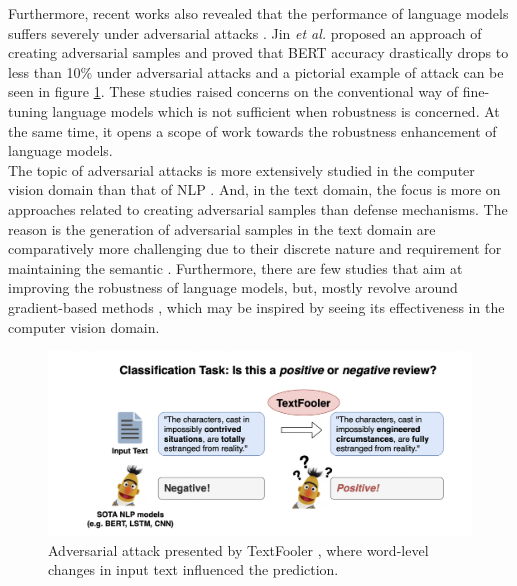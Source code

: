 \documentclass[%
	BCOR=8mm, %
	DIV=12,
	toc=bibliography, %
	toc=listof, %
	oneside, %
	egregdoesnotlikesansseriftitles, %
	]{scrbook}
\begin{document}
Furthermore,  recent works also revealed that the performance of language models suffers severely under adversarial attacks \cite{li_bert-attack_2020,garg_bae_2020,moradi_evaluating_2021-1}. Jin \textit{et al.} \cite{jin_is_2020}  proposed an approach of creating adversarial samples and proved that BERT accuracy drastically drops to less than 10\% under adversarial attacks and a pictorial example of attack can be seen in figure \ref{diag:ExampleAdversarial}. These studies raised concerns on the conventional way of fine-tuning language models which is not sufficient when robustness is concerned. At the same time, it opens a scope of work towards the robustness enhancement of language models.\\
The topic of adversarial attacks is more extensively studied in the computer vision domain than that of NLP \cite{wang_towards_2021}. And, in the text domain, the focus is more on approaches related to creating adversarial samples than defense mechanisms. The reason is the generation of adversarial samples in the text domain are comparatively more challenging due to their discrete nature and requirement for maintaining the semantic \cite{li_bert-attack_2020}. Furthermore, there are few studies that aim at improving the robustness of language models, but, mostly revolve around gradient-based methods \cite{zhu_at-bert_2021,miyato_adversarial_2017,jiang_smart_2020-1}, which may be inspired by seeing its effectiveness in the computer vision domain.\\
\begin{figure}[H]
    \centering
    \includegraphics[width=.85\textwidth]{img/Introduction-Fig-1.png}
    \caption[Example of adversarial attack in text-domain]{Adversarial attack presented by TextFooler \cite{jin_is_2020}, where word-level changes in input text influenced the prediction.}
    \label{diag:ExampleAdversarial}
\end{figure}
\end{document}
